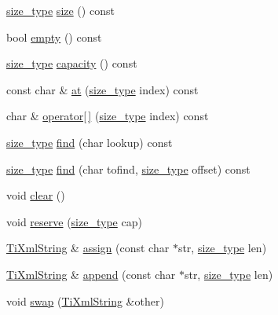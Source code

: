 \begin{DoxyCompactItemize}
\item 
\hyperlink{class_ti_xml_string_abeb2c1893a04c17904f7c06546d0b971}{size\_\-type} \hyperlink{class_ti_xml_string_a96103e5c0f67e987fa48527e1f47a1f6}{size} () const 
\item 
bool \hyperlink{class_ti_xml_string_a9a61e1d11cdb71bea4a4ed79caa793f4}{empty} () const 
\item 
\hyperlink{class_ti_xml_string_abeb2c1893a04c17904f7c06546d0b971}{size\_\-type} \hyperlink{class_ti_xml_string_a76e4d6aba7845f4cf9c02332a5fbf916}{capacity} () const 
\item 
const char \& \hyperlink{class_ti_xml_string_a6763093267bbdecbf03f8840bc349877}{at} (\hyperlink{class_ti_xml_string_abeb2c1893a04c17904f7c06546d0b971}{size\_\-type} index) const 
\item 
char \& \hyperlink{class_ti_xml_string_ae8cdc1d46c538536b786f7ae03c0c1d9}{operator\mbox{[}$\,$\mbox{]}} (\hyperlink{class_ti_xml_string_abeb2c1893a04c17904f7c06546d0b971}{size\_\-type} index) const 
\item 
\hyperlink{class_ti_xml_string_abeb2c1893a04c17904f7c06546d0b971}{size\_\-type} \hyperlink{class_ti_xml_string_a5c2b368b5eafe075fd9565cbcbd4c2f9}{find} (char lookup) const 
\item 
\hyperlink{class_ti_xml_string_abeb2c1893a04c17904f7c06546d0b971}{size\_\-type} \hyperlink{class_ti_xml_string_a5f2a6fd565751410b392f249a9786db4}{find} (char tofind, \hyperlink{class_ti_xml_string_abeb2c1893a04c17904f7c06546d0b971}{size\_\-type} offset) const 
\item 
void \hyperlink{class_ti_xml_string_ab20e06e4c666abf3bdbfb3a1191d4888}{clear} ()
\item 
void \hyperlink{class_ti_xml_string_a88ecf9f0f00cb5c67b6b637958d7049c}{reserve} (\hyperlink{class_ti_xml_string_abeb2c1893a04c17904f7c06546d0b971}{size\_\-type} cap)
\item 
\hyperlink{class_ti_xml_string}{TiXmlString} \& \hyperlink{class_ti_xml_string_ac72f3d9149b7812c1e6c59402014d0d5}{assign} (const char $\ast$str, \hyperlink{class_ti_xml_string_abeb2c1893a04c17904f7c06546d0b971}{size\_\-type} len)
\item 
\hyperlink{class_ti_xml_string}{TiXmlString} \& \hyperlink{class_ti_xml_string_ad44b21700d2ec24a511367b222b643fb}{append} (const char $\ast$str, \hyperlink{class_ti_xml_string_abeb2c1893a04c17904f7c06546d0b971}{size\_\-type} len)
\item 
void \hyperlink{class_ti_xml_string_aa392cbc180752a79f007f4f9280c7762}{swap} (\hyperlink{class_ti_xml_string}{TiXmlString} \&other)
\end{DoxyCompactItemize}
